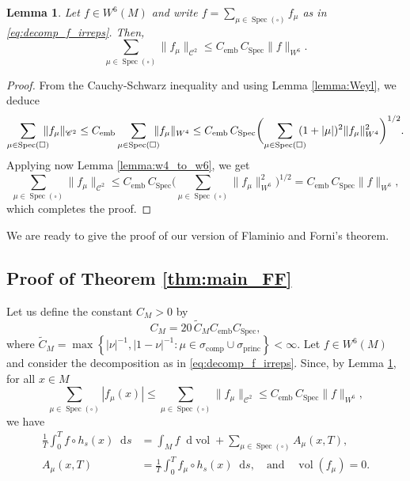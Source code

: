 \documentclass[10pt]{amsart}
\newcommand*{\diff}{\mathop{}\!\mathrm{d}}
\DeclareMathOperator{\vol}{vol}
\DeclareMathOperator{\emb}{emb}
\DeclareMathOperator{\Spec}{Spec}
\DeclareMathOperator{\comp}{comp}
\DeclareMathOperator{\princ}{princ}
\newtheorem {lemma}[theorem]{Lemma}
\theoremstyle{definition}
\begin{document}
\begin{lemma}\label{lemma:bound_no_square}
Let $f \in W^6(M)$ and write $f= \sum_{\mu \in \Spec(\square)} f_\mu$ as in \eqref{eq:decomp_f_irreps}. Then,
\[
\sum_{\mu \in \Spec(\square)} \|f_\mu\|_{\mathscr{C}^2} \leq C_{\emb} \, C_{\Spec} \|f\|_{W^6}.
\]
\end{lemma}
\begin{proof}
From the Cauchy-Schwarz inequality and using Lemma \ref{lemma:Weyl}, we deduce
\begin{equation*}
\sum_{\mu \in \Spec(\square)}\hspace*{-2.5mm} \|f_\mu\|_{\mathscr{C}^2} \leq C_{\emb} \sum_{\mu \in \Spec(\square)}\hspace*{-2.5mm} \|f_\mu\|_{W^4} \leq C_{\emb} \, C_{\Spec} \biggl(\sum_{\mu \in \Spec(\square)}\hspace*{-2.5mm} (1+|\mu|)^2 \|f_\mu\|^2_{W^4}\biggr)^{1/2}.
\end{equation*}
Applying now Lemma \ref{lemma:w4_to_w6}, we get
\[
\sum_{\mu \in \Spec(\square)} \|f_\mu\|_{\mathscr{C}^2} \leq C_{\emb} \, C_{\Spec} \biggl(\sum_{\mu \in \Spec(\square)} \|f_\mu\|^2_{W^6} \biggr)^{1/2} = C_{\emb} \, C_{\Spec} \|f\|_{W^6},
\]
which completes the proof.
\end{proof}

We are ready to give the proof of our version of Flaminio and Forni's theorem.

\subsection{Proof of Theorem \ref{thm:main_FF}}

Let us define the constant $C_M>0$ by
\begin{equation}\label{eq:defin_CM}
C_M = 20 \, {\widetilde C_M} C_{\emb} C_{\Spec}, 
\end{equation}
where $\widetilde C_M= \max \left\{ |\nu|^{-1}, |1-\nu|^{-1} : \mu \in \sigma_{\comp} \cup \sigma_{\princ} \right\} < \infty$.
Let $f \in W^6(M)$ and consider the decomposition as in \eqref{eq:decomp_f_irreps}.
Since, by Lemma \ref{lemma:bound_no_square}, for all $x \in M$
\[
\sum_{\mu \in \Spec(\square)} |f_\mu(x)|\leq \sum_{\mu \in \Spec(\square)} \|f_\mu\|_{\mathscr{C}^2} \leq C_{\emb} \, C_{\Spec} \|f\|_{W^6},
\]
we have
\begin{align}\label{eq:int_A}
\frac{1}{T} \int_0^T f \circ h_s(x) \diff s &= \int_M f \diff \vol + \sum_{\mu \in \Spec(\square) } A_{\mu}(x,T), \\
\tag*{where} A_{\mu}(x,T) &= \frac{1}{T} \int_0^T f_\mu \circ h_s(x) \diff s, \quad\text{and}\quad \vol(f_\mu)=0.
\end{align}
\end{document}
